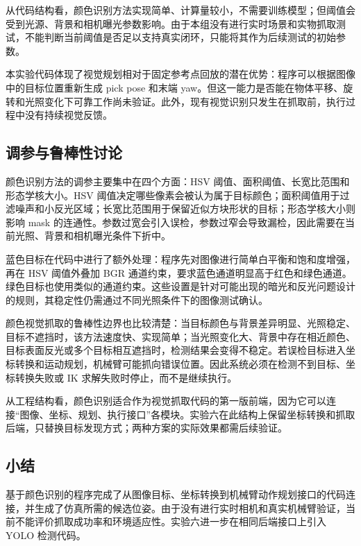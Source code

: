 从代码结构看，颜色识别方法实现简单、计算量较小，不需要训练模型；但阈值会受到光源、背景和相机曝光参数影响。由于本组没有进行实时场景和实物抓取测试，不能判断当前阈值是否足以支持真实闭环，只能将其作为后续测试的初始参数。

本实验代码体现了视觉规划相对于固定参考点回放的潜在优势：程序可以根据图像中的目标位置重新生成 pick pose 和末端 yaw。但这一能力是否能在物体平移、旋转和光照变化下可靠工作尚未验证。此外，现有视觉识别只发生在抓取前，执行过程中没有持续视觉反馈。

\subsection{调参与鲁棒性讨论}

颜色识别方法的调参主要集中在四个方面：HSV 阈值、面积阈值、长宽比范围和形态学核大小。HSV 阈值决定哪些像素会被认为属于目标颜色；面积阈值用于过滤噪声和小反光区域；长宽比范围用于保留近似方块形状的目标；形态学核大小则影响 mask 的连通性。参数过宽会引入误检，参数过窄会导致漏检，因此需要在当前光照、背景和相机曝光条件下折中。

蓝色目标在代码中进行了额外处理：程序先对图像进行简单白平衡和饱和度增强，再在 HSV 阈值外叠加 BGR 通道约束，要求蓝色通道明显高于红色和绿色通道。绿色目标也使用类似的通道约束。这些设置是针对可能出现的暗光和反光问题设计的规则，其稳定性仍需通过不同光照条件下的图像测试确认。

颜色视觉抓取的鲁棒性边界也比较清楚：当目标颜色与背景差异明显、光照稳定、目标不遮挡时，该方法速度快、实现简单；当光照变化大、背景中存在相近颜色、目标表面反光或多个目标相互遮挡时，检测结果会变得不稳定。若误检目标进入坐标转换和运动规划，机械臂可能抓向错误位置。因此系统必须在检测不到目标、坐标转换失败或 IK 求解失败时停止，而不是继续执行。

从工程结构看，颜色识别适合作为视觉抓取代码的第一版前端，因为它可以连接“图像、坐标、规划、执行接口”各模块。实验六在此结构上保留坐标转换和抓取后端，只替换目标发现方式；两种方案的实际效果都需后续验证。

\subsection{小结}

基于颜色识别的程序完成了从图像目标、坐标转换到机械臂动作规划接口的代码连接，并生成了仿真所需的候选位姿。由于没有进行实时相机和真实机械臂验证，当前不能评价抓取成功率和环境适应性。实验六进一步在相同后端接口上引入 YOLO 检测代码。
